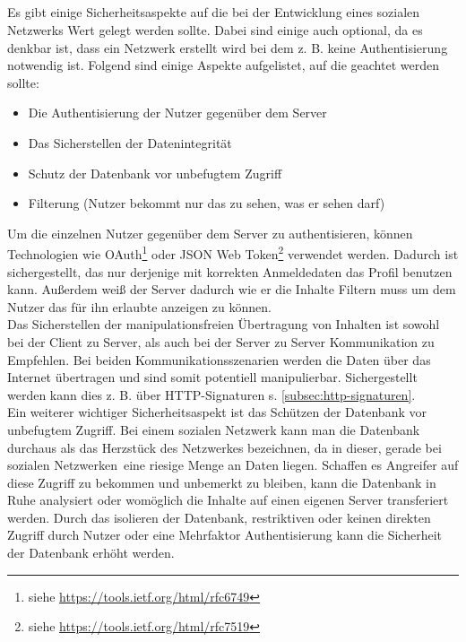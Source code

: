 	\subsection{
	}
	Es gibt einige Sicherheitsaspekte auf die bei der Entwicklung eines sozialen Netzwerks Wert gelegt werden sollte. Dabei sind einige auch optional, da es denkbar ist, dass ein Netzwerk erstellt wird bei dem z. B. keine Authentisierung notwendig ist. Folgend sind einige Aspekte aufgelistet, auf die geachtet werden sollte:
	\begin{itemize}
		\item Die Authentisierung der Nutzer gegenüber dem Server
		\item Das Sicherstellen der Datenintegrität
		\item Schutz der Datenbank vor unbefugtem Zugriff
		\item Filterung (Nutzer bekommt nur das zu sehen, was er sehen darf)
	\end{itemize}
	Um die einzelnen Nutzer gegenüber dem Server zu authentisieren, können Technologien wie OAuth\footnote{siehe \url{https://tools.ietf.org/html/rfc6749}} oder JSON Web Token\footnote{siehe \url{https://tools.ietf.org/html/rfc7519}} verwendet werden. Dadurch ist sichergestellt, das nur derjenige mit korrekten Anmeldedaten das Profil benutzen kann. Außerdem weiß der Server dadurch wie er die Inhalte Filtern muss um dem Nutzer das für ihn erlaubte anzeigen zu können.\\
	
	Das Sicherstellen der manipulationsfreien Übertragung von Inhalten ist sowohl bei der Client zu Server, als auch bei der Server zu Server Kommunikation zu Empfehlen. Bei beiden Kommunikationsszenarien werden die Daten über das Internet übertragen und sind somit potentiell manipulierbar. Sichergestellt werden kann dies z. B. über HTTP-Signaturen s. \ref{subsec:http-signaturen}.\\
	
	Ein weiterer wichtiger Sicherheitsaspekt ist das Schützen der Datenbank vor unbefugtem Zugriff. Bei einem sozialen Netzwerk kann man die Datenbank durchaus als das Herzstück des Netzwerkes bezeichnen, da in dieser, gerade bei \glqq sozialen Netzwerken\grqq~eine riesige Menge an Daten liegen. Schaffen es Angreifer auf diese Zugriff zu bekommen und unbemerkt zu bleiben, kann die Datenbank in Ruhe analysiert oder womöglich die Inhalte auf einen eigenen Server transferiert werden. Durch das isolieren der Datenbank, restriktiven oder keinen direkten Zugriff durch Nutzer oder eine Mehrfaktor Authentisierung kann die Sicherheit der Datenbank erhöht werden.

